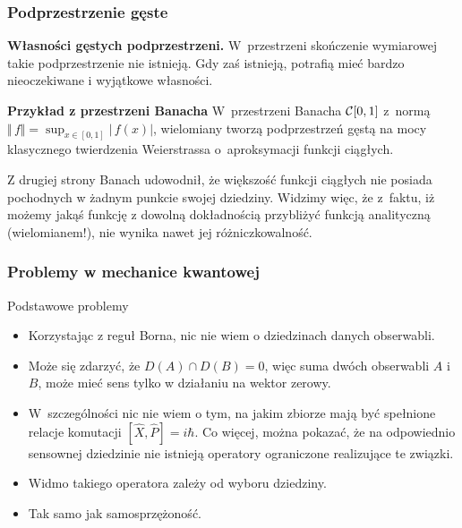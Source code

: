 \documentclass[10pt,t]{beamer}
\begin{document}
\begin{frame}
  \frametitle{Podprzestrzenie gęste}


  \textbf{Własności gęstych podprzestrzeni.}
  W~przestrzeni skończenie wymiarowej takie podprzestrzenie nie istnieją.
  Gdy zaś istnieją, potrafią mieć bardzo nieoczekiwane i wyjątkowe własności.

  \textbf{Przykład z przestrzeni Banacha}
  W~przestrzeni Banacha $\mathcal{C}[ 0, 1 ]$ z~normą
  $\Vert \, f \Vert = \sup_{ x \in [ 0, 1 ] } | \, f( x ) |$, wielomiany tworzą
  podprzestrzeń gęstą na mocy klasycznego twierdzenia Weierstrassa
  o~aproksymacji funkcji ciągłych.

  Z drugiej strony Banach udowodnił, że większość funkcji ciągłych nie
  posiada pochodnych w żadnym punkcie swojej dziedziny. Widzimy więc, że
  z~faktu, iż możemy jakąś funkcję z dowolną dokładnością przybliżyć funkcją
  analityczną (wielomianem!), nie wynika nawet jej różniczkowalność.

\end{frame}





\begin{frame}
  \frametitle{Problemy w mechanice kwantowej}


  Podstawowe problemy
  \begin{itemize}
    \RaggedRight

  \item Korzystając z reguł Borna, nic nie wiem o dziedzinach danych
    obserwabli.

  \item Może się zdarzyć, że $D( A ) \cap D( B ) = {0}$, więc suma dwóch
    obserwabli $A$ i~$B$, może mieć sens tylko w działaniu na wektor zerowy.

  \item W~szczególności nic nie wiem o tym, na jakim zbiorze mają być
    spełnione relacje komutacji $[ \widehat{ X }, \widehat{ P } ] = i \hbar$.
    Co więcej, można pokazać, że na odpowiednio sensownej dziedzinie nie
    istnieją operatory ograniczone realizujące te związki.

  \item Widmo takiego operatora zależy od wyboru dziedziny.

  \item Tak samo jak samosprzężoność.

  \end{itemize}

\end{frame}
\end{document}
